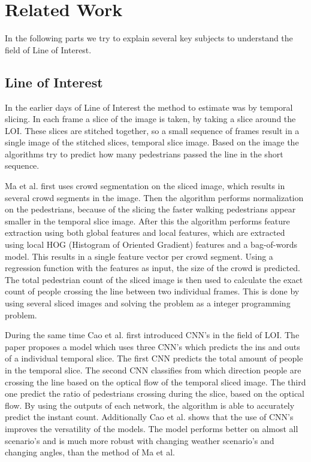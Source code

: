 \section{Related Work}
In the following parts we try to explain several key subjects to understand the field of Line of Interest.


\subsection{Line of Interest}
In the earlier days of Line of Interest the method to estimate was by temporal slicing. In each frame a slice of the image is taken, by taking a slice around the LOI. These slices are stitched together, so a small sequence of frames result in a single image of the stitched slices, temporal slice image. Based on the image the algorithms try to predict how many pedestrians passed the line in the short sequence.

Ma et al. \cite{ma_counting_2016} first uses crowd segmentation on the sliced image, which results in several crowd segments in the image. Then the algorithm performs normalization on the pedestrians, because of the slicing the faster walking pedestrians appear smaller in the temporal slice image. After this the algorithm performs feature extraction using both global features and local features, which are extracted using local HOG (Histogram of Oriented Gradient) features and a bag-of-words model. This results in a single feature vector per crowd segment. Using a regression function with the features as input, the size of the crowd is predicted. The total pedestrian count of the sliced image is then used to calculate the exact count of people crossing the line between two individual frames. This is done by using several sliced images and solving the problem as a integer programming problem.

During the same time Cao et al. \cite{cao_large_2015} first introduced CNN's in the field of LOI. The paper proposes a model which uses three CNN's which predicts the ins and outs of a individual temporal slice. The first CNN predicts the total amount of people in the temporal slice. The second CNN classifies from which direction people are crossing the line based on the optical flow of the temporal sliced image. The third one predict the ratio of pedestrians crossing during the slice, based on the optical flow. By using the outputs of each network, the algorithm is able to accurately predict the instant count. Additionally Cao et al. \cite{cao_large_2015} shows that the use of CNN's improves the versatility of the models. The model performs better on almost all scenario's and is much more robust with changing weather scenario's and changing angles, than the method of Ma et al. \cite{ma_counting_2016}

